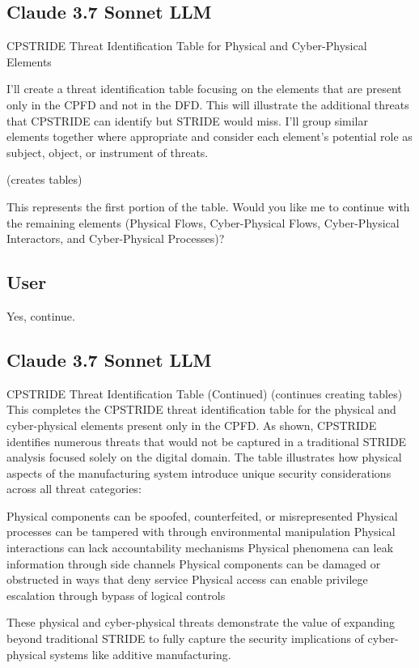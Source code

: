 \subsection{Claude 3.7 Sonnet LLM}

CPSTRIDE Threat Identification Table for Physical and Cyber-Physical Elements

I'll create a threat identification table focusing on the elements that are present only in the CPFD and not in the DFD. This will illustrate the additional threats that CPSTRIDE can identify but STRIDE would miss. I'll group similar elements together where appropriate and consider each element's potential role as subject, object, or instrument of threats.

(creates tables)

This represents the first portion of the table. Would you like me to continue with the remaining elements (Physical Flows, Cyber-Physical Flows, Cyber-Physical Interactors, and Cyber-Physical Processes)?

\subsection{User}
Yes, continue.

\subsection{Claude 3.7 Sonnet LLM}
CPSTRIDE Threat Identification Table (Continued)
(continues creating tables)
This completes the CPSTRIDE threat identification table for the physical and cyber-physical elements present only in the CPFD. As shown, CPSTRIDE identifies numerous threats that would not be captured in a traditional STRIDE analysis focused solely on the digital domain.
The table illustrates how physical aspects of the manufacturing system introduce unique security considerations across all threat categories:

Physical components can be spoofed, counterfeited, or misrepresented
Physical processes can be tampered with through environmental manipulation
Physical interactions can lack accountability mechanisms
Physical phenomena can leak information through side channels
Physical components can be damaged or obstructed in ways that deny service
Physical access can enable privilege escalation through bypass of logical controls

These physical and cyber-physical threats demonstrate the value of expanding beyond traditional STRIDE to fully capture the security implications of cyber-physical systems like additive manufacturing.